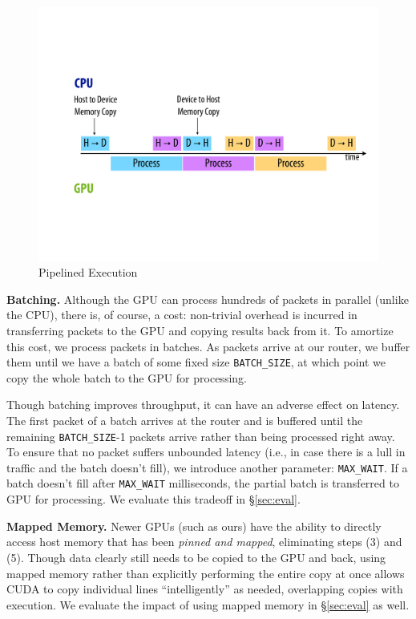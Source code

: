 \begin{figure}
   \centering
   \includegraphics[scale=0.25]{figs/pipelining.pdf}
   \caption{Pipelined Execution}
   \label{fig:pipelining}
\end{figure}

\medskip \noindent \textbf{Batching.} Although the GPU can process hundreds of
packets in parallel (unlike the CPU), there is, of course, a cost: non-trivial
overhead is incurred in transferring packets to the GPU and copying results
back from it. To amortize this cost, we process packets in batches. As packets
arrive at our router, we buffer them until we have a batch of some fixed size
\texttt{BATCH\_SIZE}, at which point we copy the whole batch to the GPU for
processing.

Though batching improves throughput, it can have an adverse effect on latency.
The first packet of a batch arrives at the router and is buffered until the
remaining \texttt{BATCH\_SIZE}-1 packets arrive rather than being processed
right away. To ensure that no packet suffers unbounded latency (i.e., in case
there is a lull in traffic and the batch doesn't fill), we introduce another
parameter: \texttt{MAX\_WAIT}. If a batch doesn't fill after \texttt{MAX\_WAIT}
milliseconds, the partial batch is transferred to GPU for processing. We
evaluate this tradeoff in \S\ref{sec:eval}.

\medskip \noindent \textbf{Mapped Memory.} Newer GPUs (such as ours) have the
ability to directly access host memory that has been \emph{pinned and mapped},
eliminating steps (3) and (5). Though data clearly still needs to be copied to
the GPU and back, using mapped memory rather than explicitly performing the
entire copy at once allows CUDA to copy individual lines ``intelligently'' as
needed, overlapping copies with execution. We evaluate the impact of using
mapped memory in \S\ref{sec:eval} as well.

